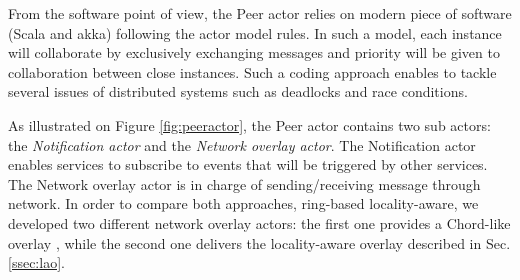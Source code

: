 From the software point of view, the Peer actor relies on modern piece of
software (Scala and akka)  following  the actor model rules.  In such a model,
each instance will collaborate by exclusively exchanging messages and priority
will be given to collaboration between close instances.  Such a coding approach
enables to tackle several issues of distributed systems such as deadlocks and
race conditions.


%

As illustrated on Figure \ref {fig:peeractor}, the Peer actor contains two sub
actors: the \emph{Notification actor} and the \emph{Network overlay actor}. The
Notification actor enables services to subscribe to events that will be
triggered by other services. The Network overlay actor is in charge of
sending/receiving message through network. In order to compare both approaches, ring-based \vs locality-aware, we developed two different
network overlay actors: the first one provides a Chord-like overlay 
\cite{stoica2001chord}, while the second one delivers the locality-aware overlay described in Sec. \ref{ssec:lao}.

